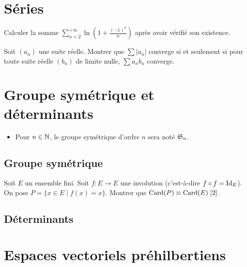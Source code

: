 \documentclass[12pt,a4paper]{exo_book}
\begin{document}
\chapter{Séries}

\begin{exo}
    Calculer la somme $\sum_{n=2}^{+\infty} \ln \left(1 + \frac{(-1)^n}{n} \right)$ après avoir vérifié son existence.
\end{exo}

\begin{exo}
    Soit $(a_n)$ une suite réelle. Montrer que $\sum |a_n|$ converge si et seulement si pour toute suite réelle $(b_n)$ de limite nulle, $\sum a_n b_n$ converge.
\end{exo}

\chapter{Groupe symétrique et déterminants}

\begin{notation}
\hspace{1pt}
\begin{itemize}
    \item Pour $n \in \mathbb{N}$, le groupe symétrique d'ordre $n$ sera noté $\frak{S}_n$.
\end{itemize}
\end{notation}

\section{Groupe symétrique}

\begin{exo}
    Soit $E$ un ensemble fini. Soit $f : E \to E$ une involution (c'est-à-dire $f \circ f = \mathrm{Id}_E$). On pose $P = \{x\in E \mid f(x) = x\}$. Montrer que $\operatorname{Card} (P) \equiv \operatorname{Card} (E) \; [2]$.
\end{exo}

\section{Déterminants}

\chapter{Espaces vectoriels préhilbertiens}
\end{document}
